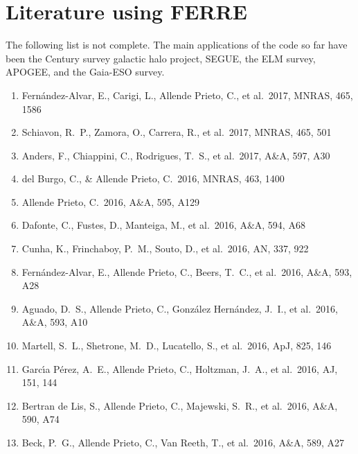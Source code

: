 \documentclass[12pt]{article}
\begin{document}
\section{Literature using FERRE}
\label{literature}

The following list is not complete. The main applications of the code so far 
have been the Century survey galactic halo project, SEGUE, the ELM survey, 
APOGEE, and the Gaia-ESO survey.

\begin{enumerate}

\item Fern{\'a}ndez-Alvar, E., Carigi, L., Allende Prieto, C., et al.\ 2017, MNRAS, 465, 1586 


\item Schiavon, R.~P., Zamora, O., Carrera, R., et al.\ 2017, MNRAS, 465, 501 


\item Anders, F., Chiappini, C., Rodrigues, T.~S., et al.\ 2017, A\&A, 597, A30 


\item del Burgo, C., \& Allende Prieto, C.\ 2016, MNRAS, 463, 1400 


\item Allende Prieto, C.\ 2016, A\&A, 595, A129 


\item Dafonte, C., Fustes, D., Manteiga, M., et al.\ 2016, A\&A, 594, A68 


\item Cunha, K., Frinchaboy, P.~M., Souto, D., et al.\ 2016, AN, 337, 922 


\item Fern{\'a}ndez-Alvar, E., Allende Prieto, C., Beers, T.~C., et al.\ 2016, A\&A, 593, A28 


\item Aguado, D.~S., Allende Prieto, C., Gonz{\'a}lez Hern{\'a}ndez, J.~I., et al.\ 2016, A\&A, 593, A10 


\item Martell, S.~L., Shetrone, M.~D., Lucatello, S., et al.\ 2016, ApJ, 825, 146 


\item Garc{\'{\i}}a P{\'e}rez, A.~E., Allende Prieto, C., Holtzman, J.~A., et al.\ 2016, AJ, 151, 144 


\item Bertran de Lis, S., Allende Prieto, C., Majewski, S.~R., et al.\ 2016, A\&A, 590, A74 


\item Beck, P.~G., Allende Prieto, C., Van Reeth, T., et al.\ 2016, A\&A, 589, A27 



\end{enumerate}
\end{document}
